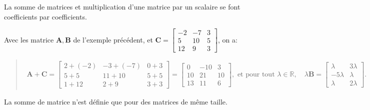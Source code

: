 \documentclass[letterpaper,11pt,english]{sphinxmanual}
\begin{document}
\begin{DUlineblock}{0em}
\item[] 
\item[] La somme de matrices et multiplication d’une matrice par un scalaire
se font coefficients par coefficients.
\item[] Avec les matrice \(\mathbf{A}, \mathbf{B}\) de l’exemple
précédent, et
\(\mathbf{C}=\begin{bmatrix} -2 & -7 & 3\\ 5 &10 & 5\\ 12& 9 & 3 \end{bmatrix}\),
on a:
\end{DUlineblock}
\begin{quote}
\begin{equation}\label{equation:chapter2:chapter2:6}
\begin{split}\mathbf{A}+ \mathbf{C} = \begin{bmatrix}
2+(-2) & -3+(-7) & 0+3\\
5+5 &11+10 & 5+5\\
1+12& 2+9 & 3+3
\end{bmatrix}=\begin{bmatrix}
0 & -10 & 3\\
10 &21 & 10\\
13& 11 & 6
\end{bmatrix}, \text{ et pour tout } \lambda \in \mathbb{R}, \quad
\lambda \mathbf{B} = \begin{bmatrix}
\lambda & 3 \lambda\\
-5 \lambda & \lambda\\
\lambda & 2\lambda
\end{bmatrix}.\end{split}
\end{equation}\end{quote}

\begin{DUlineblock}{0em}
\item[]  La somme de matrice n’est définie que pour des matrices de
même taille.
\item[] 
\end{DUlineblock}
\end{document}
